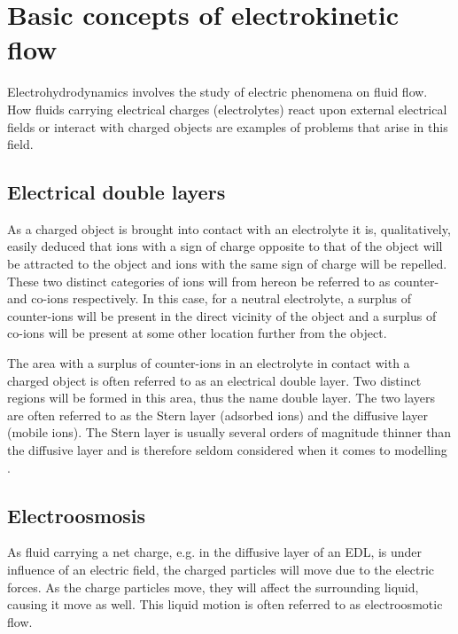 \section{Basic concepts of electrokinetic flow}
Electrohydrodynamics involves the study of electric phenomena on fluid
flow. How fluids carrying electrical charges (electrolytes) react upon
external electrical fields or interact with charged objects are
examples of problems that arise in this field. 

\subsection{Electrical double layers}
As a charged object is brought into contact with an electrolyte it is,
qualitatively, easily deduced that ions with a sign of charge opposite
to that of the object will be attracted to the object and ions with
the same sign of charge will be repelled. These two distinct
categories of ions will from hereon be referred to as counter- and
co-ions respectively. In this case, for a neutral electrolyte, a
surplus of counter-ions will be present in the direct vicinity of the
object and a surplus of co-ions will be present at some other location
further from the object.
 
The area with a surplus of counter-ions in an electrolyte in contact
with a charged object is often referred to as an electrical double
layer. Two distinct regions will be formed in this area, thus the name 
double layer. The two layers are often referred to as the Stern
layer (adsorbed ions) and the diffusive layer (mobile ions). The Stern
layer is usually several orders of magnitude thinner than the
diffusive layer and is therefore seldom considered when it comes to
modelling \cite{donquing-ren}. 

\subsection{Electroosmosis}
As fluid carrying a net charge, e.g. in the diffusive layer of an EDL,
is under influence of an electric field, the charged particles will
move due to the electric forces. As the charge particles move, they
will affect the surrounding liquid, causing it move as well. This
liquid motion is often referred to as electroosmotic
flow. \cite{dongquing-ren-book}


